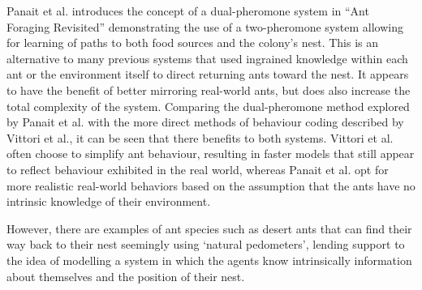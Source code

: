     
    Panait et al. introduces the concept of a dual-pheromone system in ``Ant Foraging Revisited''\cite{a_panait_ant_2004} demonstrating the use of a two-pheromone system allowing for learning of paths to both food sources
    and the colony's nest. This is an alternative to many previous systems that used ingrained knowledge within each ant or the environment itself to direct returning ants toward the nest. It appears to have the benefit %
    of better mirroring real-world ants, but does also increase the total complexity of the system.
    Comparing the dual-pheromone method explored by Panait et al.\cite{a_panait_ant_2004} with the more direct methods of behaviour coding described by Vittori et al.\cite{vittori_modeling_2004}, it can be seen that there
    benefits to both systems. Vittori et al. often choose to simplify ant behaviour, resulting in faster models that still appear to reflect behaviour exhibited in the real world, %
    whereas Panait et al. opt for more realistic real-world behaviors based on the assumption that the ants have no intrinsic knowledge of their environment.
    
    However, there are examples of ant species such as desert ants that can find their way back to their nest seemingly using `natural pedometers'\cite{khamsi_2006}, lending support to the idea of modelling a system in which 
    the agents know intrinsically information about themselves and the position of their nest.


